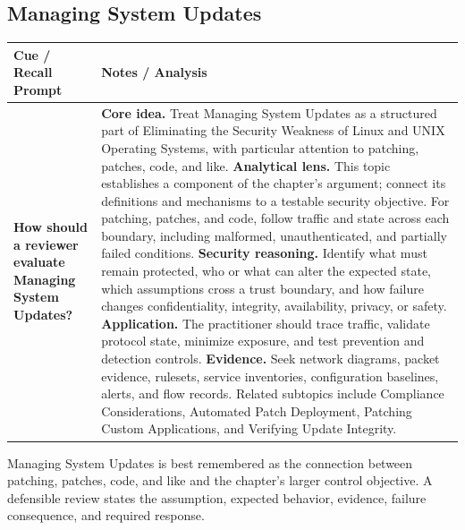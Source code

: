 \documentclass[11pt]{article}
\newcommand{\CornellHeader}{%
\rowcolor{Navy}\color{white}\bfseries Cue / Recall Prompt & \color{white}\bfseries Notes / Analysis\\\hline}
\newcommand{\CornellRow}[2]{%
\cellcolor{CueGray}\RaggedRight\textbf{#1} & \RaggedRight #2\\\hline}
\begin{document}
\subsection*{Managing System Updates}
\begin{longtable}{>{\RaggedRight\arraybackslash}p{}|>{\RaggedRight\arraybackslash}p{}}
\CornellHeader
\CornellRow{How should a reviewer evaluate Managing System Updates?}{\textbf{Core idea.} Treat Managing System Updates as a structured part of Eliminating the Security Weakness of Linux and UNIX Operating Systems, with particular attention to patching, patches, code, and like. \textbf{Analytical lens.} This topic establishes a component of the chapter's argument; connect its definitions and mechanisms to a testable security objective. For patching, patches, and code, follow traffic and state across each boundary, including malformed, unauthenticated, and partially failed conditions. \textbf{Security reasoning.} Identify what must remain protected, who or what can alter the expected state, which assumptions cross a trust boundary, and how failure changes confidentiality, integrity, availability, privacy, or safety. \textbf{Application.} The practitioner should trace traffic, validate protocol state, minimize exposure, and test prevention and detection controls. \textbf{Evidence.} Seek network diagrams, packet evidence, rulesets, service inventories, configuration baselines, alerts, and flow records. Related subtopics include Compliance Considerations, Automated Patch Deployment, Patching Custom Applications, and Verifying Update Integrity.}
\end{longtable}
\begin{topicsummary}
Managing System Updates is best remembered as the connection between patching, patches, code, and like and the chapter's larger control objective. A defensible review states the assumption, expected behavior, evidence, failure consequence, and required response.
\end{topicsummary}
\end{document}
